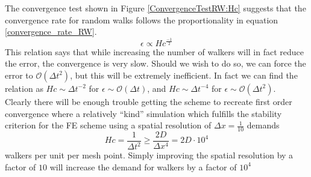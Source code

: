 The convergence test shown in Figure \ref{ConvergenceTestRW:Hc} suggests that the convergence rate for random walks follows the proportionality in equation \eqref{convergence_rate_RW}. 
\begin{equation}\label{convergence_rate_RW}
\epsilon \propto Hc^{\frac{-1}{2}}
\end{equation}
This relation says that while increasing the number of walkers will in fact reduce the error, the convergence is very slow. 
Should we wish to do so, we can force the error to $\mathcal{O}(\Delta t^2)$, but this will be extremely inefficient. In fact we can find the relation as $Hc\sim\Delta t^{-2}$ for $\epsilon\sim\mathcal{O}(\Delta t)$, and $Hc\sim\Delta t^{-4}$ for $\epsilon\sim\mathcal{O}(\Delta t^2)$. \\
Clearly there will be enough trouble getting the scheme to recreate first order convergence where a relatively ``kind'' simulation which fulfills the stability criterion for the FE scheme using a spatial resolution of $\Delta x = \frac{1}{10}$ demands
\begin{equation}
 Hc = \frac{1}{\Delta t^2} \geq \frac{2D}{\Delta x^4} = 2D\cdot 10^4
\end{equation}
walkers per unit per mesh point. Simply improving the spatial resolution by a factor of $10$ will increase the demand for walkers by a factor of $10^4$



